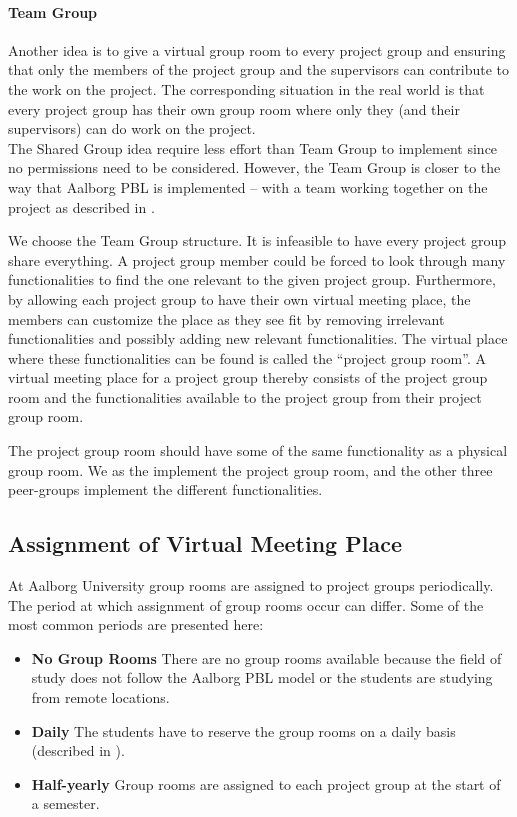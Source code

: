 \paragraph{Team Group} Another idea is to give a virtual group room to every project group and ensuring that only the members of the project group and the supervisors can contribute to the work on the project.
The corresponding situation in the real world is that every project group has their own group room where only they (and their supervisors) can do work on the project. \\

The Shared Group idea require less effort than Team Group to implement since no permissions need to be considered.
However, the Team Group is closer to the way that Aalborg PBL is implemented -- with a team working together on the project as described in .

We choose the Team Group structure. 
It is infeasible to have every project group share everything.
A project group member could be forced to look through many functionalities to find the one relevant to the given project group.
Furthermore, by allowing each project group to have their own virtual meeting place, the members can customize the place as they see fit by removing irrelevant functionalities and possibly adding new relevant functionalities.
The virtual place where these functionalities can be found is called the ``project group room''.
A virtual meeting place for a project group thereby consists of the project group room and the functionalities available to the project group from their project group room.

The project group room should have some of the same functionality as a physical group room.
We as the \groupname{} implement the project group room, and the other three peer-groups implement the different functionalities.


\subsection{Assignment of Virtual Meeting Place}
At Aalborg University group rooms are assigned to project groups periodically.
The period at which assignment of group rooms occur can differ.
Some of the most common periods are presented here:
\begin{itemize}
	\item \textbf{No Group Rooms} There are no group rooms available because the field of study does not follow the Aalborg PBL model or the students are studying from remote locations.
	\item \textbf{Daily} The students have to reserve the group rooms on a daily basis (described in ).
	\item \textbf{Half-yearly} Group rooms are assigned to each project group at the start of a semester.
\end{itemize} 

